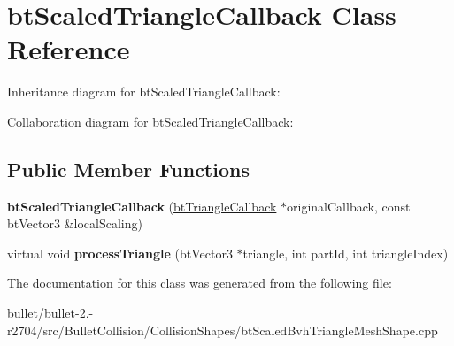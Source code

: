 \hypertarget{classbt_scaled_triangle_callback}{\section{bt\+Scaled\+Triangle\+Callback Class Reference}
\label{classbt_scaled_triangle_callback}
}


Inheritance diagram for bt\+Scaled\+Triangle\+Callback\+:


Collaboration diagram for bt\+Scaled\+Triangle\+Callback\+:
\subsection*{Public Member Functions}
\begin{DoxyCompactItemize}
\item 
\hypertarget{classbt_scaled_triangle_callback_a5cb45a79992acd5cb276af17af9d5ba4}{{\bfseries bt\+Scaled\+Triangle\+Callback} (\hyperlink{classbt_triangle_callback}{bt\+Triangle\+Callback} $\ast$original\+Callback, const bt\+Vector3 \&local\+Scaling)}\label{classbt_scaled_triangle_callback_a5cb45a79992acd5cb276af17af9d5ba4}

\item 
\hypertarget{classbt_scaled_triangle_callback_a4eafbc5dc2d56c30dd5e2c0db5cb19b3}{virtual void {\bfseries process\+Triangle} (bt\+Vector3 $\ast$triangle, int part\+Id, int triangle\+Index)}\label{classbt_scaled_triangle_callback_a4eafbc5dc2d56c30dd5e2c0db5cb19b3}

\end{DoxyCompactItemize}


The documentation for this class was generated from the following file\+:\begin{DoxyCompactItemize}
\item 
bullet/bullet-\/2.-\/r2704/src/\+Bullet\+Collision/\+Collision\+Shapes/bt\+Scaled\+Bvh\+Triangle\+Mesh\+Shape.\+cpp\end{DoxyCompactItemize}

